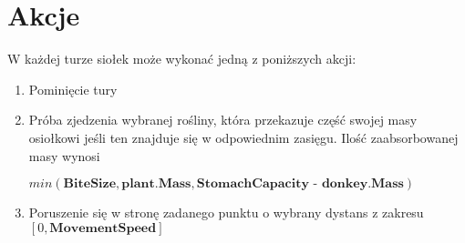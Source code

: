 \section{Akcje}
W każdej turze siołek może wykonać jedną z poniższych akcji:
\begin{enumerate}    
    \item Pominięcie tury
    \item Próba zjedzenia wybranej rośliny, która przekazuje część swojej masy osiołkowi jeśli ten znajduje się w odpowiednim zasięgu. Ilość zaabsorbowanej masy wynosi 
    
    $min(\textbf{BiteSize}, \textbf{plant.Mass}, \textbf{StomachCapacity - donkey.Mass})$
    \item Poruszenie się w stronę zadanego punktu o wybrany dystans z zakresu $[0,\textbf{MovementSpeed}]$
\end{enumerate}



